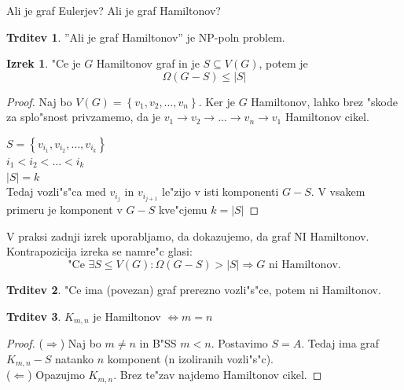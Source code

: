 \documentclass{article}
\theoremstyle{definition}
\newtheorem{claim}{Trditev}[section]
\newtheorem{theorem}{Izrek}[section]
\begin{document}
	Ali je graf Eulerjev? Ali je graf Hamiltonov?
	\begin{claim}
		''Ali je graf Hamiltonov'' je NP-poln problem. %
	\end{claim}

	\begin{theorem}
		"Ce je $G$ Hamiltonov graf in je $S \subseteq V(G)$, potem je
		$$\Omega(G-S) \leq |S|$$
		\begin{proof}
			Naj bo $V(G) = \left\lbrace v_1, v_2, \ldots, v_n \right\rbrace $. Ker je $G$ Hamiltonov, lahko brez "skode za splo"snost privzamemo, da je $v_1 \rightarrow v_2 \rightarrow ... \rightarrow v_n \rightarrow v_1 $ Hamiltonov cikel. 
			
			$S = \left\lbrace v_{i_1}, v_{i_2}, \ldots, v_{i_k} \right\rbrace $ \\
			$ i_1 < i_2 < \ldots < i_k $ \\
			$|S| = k$ \\
			Tedaj vozli"s"ca med $v_{i_j}$ in $v_{i_{j+1}}$ le"zijo v isti komponenti $G-S$.
			V vsakem primeru je komponent v $G-S$ kve"cjemu $k=|S|$
		\end{proof}
	\end{theorem}

	V praksi zadnji izrek uporabljamo, da dokazujemo, da graf NI Hamiltonov. Kontrapozicija izreka se namre"c glasi: 
	$$ \text{"Ce } \exists S \leq V(G): \Omega(G-S) > |S| \Rightarrow G \text{ ni Hamiltonov.}$$
	
	\begin{claim}
		"Ce ima (povezan) graf prerezno vozli"s"ce, potem ni Hamiltonov.
	\end{claim}
	\begin{claim}
		$ K_{m,n} $ je Hamiltonov $ \iff m=n $
		\begin{proof}
			($\Rightarrow$) Naj bo $m \neq n$ in B"SS $m < n$. Postavimo $S=A$. Tedaj ima graf $K_{m,n}-S$ natanko $n$ komponent (n izoliranih vozli"s"c). \\
			($\Leftarrow$)  Opazujmo $K_{m,n}$. Brez te"zav najdemo Hamiltonov cikel.
		\end{proof}
	\end{claim}
\end{document}
